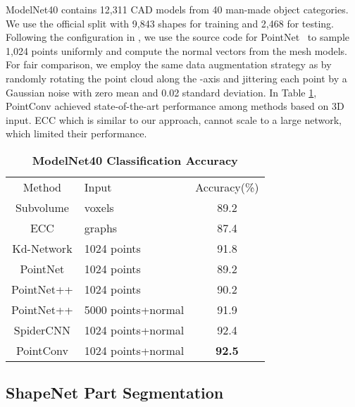 \documentclass[10pt,twocolumn,letterpaper]{article}
\begin{document}
ModelNet40 contains 12,311 CAD models from 40 man-made object categories. We use the official split with 9,843 shapes for training and 2,468 for testing. Following the configuration in \cite{qi2017pointnet}, we use the source code for PointNet~\cite{qi2017pointnet} to sample 1,024 points uniformly and compute the normal vectors from the mesh models. For fair comparison, we employ the same data augmentation strategy as \cite{qi2017pointnet} by randomly rotating the point cloud along the -axis and jittering each point by a Gaussian noise with zero mean and 0.02 standard deviation. In Table \ref{table:modelnet40},  PointConv achieved state-of-the-art performance among methods based on 3D input. ECC\cite{simonovsky2017dynamic} which is similar to our approach, cannot scale to a large network, which limited their performance.

\setlength{\tabcolsep}{4pt}
\begin{table}
	\begin{center}
		\caption{\textbf{ModelNet40 Classification Accuracy}}
		\label{table:modelnet40}
		\begin{tabular}{c|l|c}
			\hline\noalign{\smallskip}
			 Method & Input & Accuracy(\%) \\
			\noalign{\smallskip}
			\hline
			\noalign{\smallskip}
			Subvolume \cite{qi2016volumetric} & voxels & 89.2 \\
			ECC \cite{simonovsky2017dynamic} & graphs & 87.4 \\
			Kd-Network \cite{klokov2017escape} & 1024 points & 91.8 \\
			PointNet \cite{qi2017pointnet} & 1024 points & 89.2 \\
			PointNet++ \cite{qi2017pointnet++} & 1024 points & 90.2 \\
			PointNet++ \cite{qi2017pointnet++} & 5000 points+normal & 91.9 \\
			SpiderCNN \cite{xu2018spidercnn} & 1024 points+normal & 92.4 \\
			\noalign{\smallskip}
			\hline
			\noalign{\smallskip}
            PointConv & 1024 points+normal & \textbf{92.5} \\
			\hline
		\end{tabular}
	\end{center}
	\vskip -0.1in
\end{table}
\setlength{\tabcolsep}{1.4pt}

\subsection{ShapeNet Part Segmentation}
\end{document}
